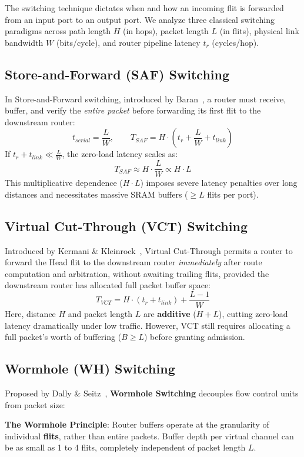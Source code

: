 The switching technique dictates when and how an incoming flit is forwarded from an input port to an output port. We analyze three classical switching paradigms across path length $H$ (in hops), packet length $L$ (in flits), physical link bandwidth $W$ (bits/cycle), and router pipeline latency $t_r$ (cycles/hop).

\subsection{Store-and-Forward (SAF) Switching}
In Store-and-Forward switching, introduced by Baran~\cite{Baran1964}, a router must receive, buffer, and verify the \emph{entire packet} before forwarding its first flit to the downstream router:
\begin{equation}
t_{serial} = \frac{L}{W}, \qquad T_{SAF} = H \cdot \left( t_r + \frac{L}{W} + t_{link} \right)
\label{eq:saf_latency}
\end{equation}
If $t_r + t_{link} \ll \frac{L}{W}$, the zero-load latency scales as:
\begin{equation}
T_{SAF} \approx H \cdot \frac{L}{W} \propto H \cdot L
\end{equation}
This multiplicative dependence ($H \cdot L$) imposes severe latency penalties over long distances and necessitates massive SRAM buffers ($\ge L$ flits per port).

\subsection{Virtual Cut-Through (VCT) Switching}
Introduced by Kermani \& Kleinrock~\cite{Kermani1979}, Virtual Cut-Through permits a router to forward the Head flit to the downstream router \emph{immediately} after route computation and arbitration, without awaiting trailing flits, provided the downstream router has allocated full packet buffer space:
\begin{equation}
T_{VCT} = H \cdot (t_r + t_{link}) + \frac{L - 1}{W}
\label{eq:vct_latency}
\end{equation}
Here, distance $H$ and packet length $L$ are \textbf{additive} ($H + L$), cutting zero-load latency dramatically under low traffic. However, VCT still requires allocating a full packet's worth of buffering ($B \ge L$) before granting admission.

\subsection{Wormhole (WH) Switching}
Proposed by Dally \& Seitz~\cite{Dally1987}, \textbf{Wormhole Switching} decouples flow control units from packet size:
\begin{svgraybox}
\textbf{The Wormhole Principle}: Router buffers operate at the granularity of individual \textbf{flits}, rather than entire packets. Buffer depth per virtual channel can be as small as 1 to 4 flits, completely independent of packet length $L$.
\end{svgraybox}

